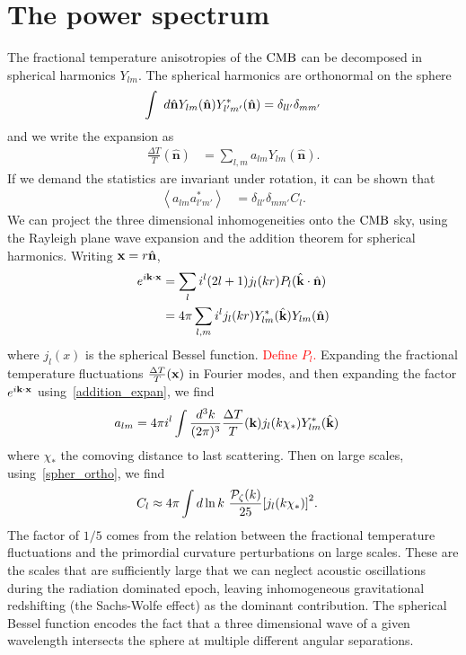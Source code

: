     \section{The power spectrum}\label{sec:power_spec_estimator}
    The fractional temperature anisotropies of the $\text{CMB}$ can be decomposed in spherical
    harmonics $Y_{lm}$.
    The spherical harmonics are orthonormal on the sphere
    \begin{align}\label{spher_ortho}
        \int~d\hat{\mathbf{n}}Y_{lm}(\hat{\mathbf{n}})Y^*_{l'm'}(\hat{\mathbf{n}}) = \delta_{ll'}\delta_{mm'}
    \end{align}
    and we write the expansion as
    \begin{align}
        \frac{\Delta T}{T}(\hat{\mathbf{n}}) &= \sum_{l,m} a_{lm}Y_{lm}(\hat{\mathbf{n}}).
    \end{align}
    If we demand the statistics are invariant under rotation, it can be shown that
    \begin{align}
        \left<a_{lm}a^*_{l'm'}\right> &= \delta_{ll'}\delta_{mm'}C_l.
    \end{align}
    We can project the three dimensional inhomogeneities onto the $\text{CMB}$ sky,
    using the Rayleigh plane wave expansion and the addition theorem
    for spherical harmonics. Writing $\mathbf{x}=r\hat{\mathbf{n}}$,
    \begin{align}
        e^{i\mathbf{k}\cdot\mathbf{x}} &= \sum_l i^l(2l+1)j_l(kr)P_l(\hat{\mathbf{k}}\cdot\hat{\mathbf{n}})\\
                    &= 4\pi\sum_{l,m}i^l j_l(kr)Y^*_{lm}(\hat{\mathbf{k}})Y_{lm}(\hat{\mathbf{n}})\label{addition_expan}
    \end{align}
    where $j_l(x)$ is the spherical Bessel function.
    \textcolor{red}{Define $P_l$.}
    Expanding the fractional temperature fluctuations
    $\frac{\Delta T}{T}(\mathbf{x})$ in Fourier modes,
    and then expanding the factor $e^{i\mathbf{k}\cdot\mathbf{x}}$ using~\eqref{addition_expan},
    we find
    \begin{align}
        a_{lm} &= 4\pi i^l\int\frac{d^3k}{(2\pi)^3}\frac{\Delta T}{T}(\mathbf{k})j_l(k\chi_*)Y^*_{lm}(\hat{\mathbf{k}})
    \end{align}
    where $\chi_*$ the comoving distance to last scattering. 
    Then on large scales, using~\eqref{spher_ortho}, we find
    \begin{align}\label{sachs_cl_example}
        C_l &\approx 4\pi\int d\ln k~\frac{\mathcal{P}_{\mathcal{\zeta}}(k)}{25}{\left[
            j_l(k\chi_*)
            \right]}^2.
    \end{align}
    The factor of $1/5$ comes from the relation between the fractional temperature
    fluctuations and the primordial curvature perturbations on large scales. These are the scales
    that are sufficiently large that we can neglect acoustic oscillations during the
    radiation dominated epoch, leaving inhomogeneous gravitational redshifting
    (the Sachs-Wolfe effect) as the dominant contribution.
    The spherical Bessel function encodes the fact that a three dimensional
    wave of a given wavelength intersects the sphere at multiple different angular separations.


